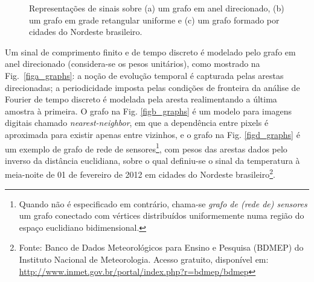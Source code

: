 \begin{figure}
	\centering
	\caption{Representa\c{c}\~oes de sinais sobre (a) um grafo em anel direcionado, (b) um grafo em grade retangular uniforme  e (c) um grafo formado por cidades do Nordeste brasileiro.}%
	\label{fig:graphs}%
\end{figure}

Um sinal de comprimento finito e de tempo discreto \'e modelado pelo grafo em anel direcionado (considera-se os pesos unit\'arios), como mostrado na Fig.~\ref{figa_graphs}: a no\c c\~ao de evolu\c c\~ao temporal \'e capturada pelas arestas direcionadas; a periodicidade imposta pelas condi\c c\~oes de fronteira da an\'alise de Fourier de tempo discreto \'e modelada pela aresta realimentando a \'ultima amostra \`a primeira. O grafo na Fig. \ref{figb_graphs} \'e um modelo para imagens digitais \cite{sandryhaila2012nearest} chamado \emph{nearest-neighbor}, em que a depend\^encia entre pixels \'e aproximada para existir apenas entre vizinhos, e o grafo na Fig. \ref{figd_graphs} \'e um exemplo de grafo de rede de sensores\footnote{Quando n\~ao \'e especificado em contr\'ario, chama-se \emph{grafo de (rede de) sensores} um grafo conectado com v\'ertices distribu\'idos uniformemente numa regi\~ao do espa\c co euclidiano bidimensional.}, com pesos das arestas dados pelo inverso da dist\^ancia euclidiana, sobre o qual definiu-se o sinal da temperatura \`a meia-noite de 01 de fevereiro de 2012 em cidades do Nordeste brasileiro\footnote{Fonte: Banco de Dados Meteorol\'ogicos para Ensino e Pesquisa (BDMEP) do Instituto Nacional de Meteorologia. Acesso gratuito, dispon\'ivel em: \url{http://www.inmet.gov.br/portal/index.php?r=bdmep/bdmep}}.

